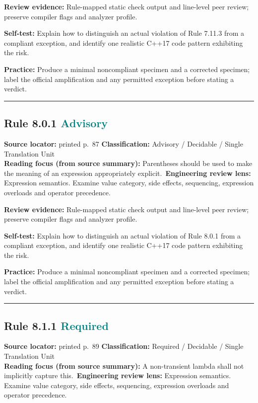 \documentclass[10pt,letterpaper]{article}
\begin{document}
\textbf{Review evidence:} Rule-mapped static check output and line-level peer review; preserve compiler flags and analyzer profile.

\textbf{Self-test:} Explain how to distinguish an actual violation of Rule 7.11.3 from a compliant exception, and identify one realistic C++17 code pattern exhibiting the risk.\par
\textbf{Practice:} Produce a minimal noncompliant specimen and a corrected specimen; label the official amplification and any permitted exception before stating a verdict.
\smallskip\hrule\smallskip
\subsection*{Rule 8.0.1 \enspace \texorpdfstring{\small\textcolor{teal}{Advisory}}{Advisory}}
\noindent\textbf{Source locator:} printed p.~87 \quad\textbf{Classification:} Advisory / Decidable / Single Translation Unit\\
\textbf{Reading focus (from source summary):} Parentheses should be used to make the meaning of an expression appropriately explicit.\
\textbf{Engineering review lens:} Expression semantics. Examine value category, side effects, sequencing, expression overloads and operator precedence.

\textbf{Review evidence:} Rule-mapped static check output and line-level peer review; preserve compiler flags and analyzer profile.

\textbf{Self-test:} Explain how to distinguish an actual violation of Rule 8.0.1 from a compliant exception, and identify one realistic C++17 code pattern exhibiting the risk.\par
\textbf{Practice:} Produce a minimal noncompliant specimen and a corrected specimen; label the official amplification and any permitted exception before stating a verdict.
\smallskip\hrule\smallskip
\subsection*{Rule 8.1.1 \enspace \texorpdfstring{\small\textcolor{teal}{Required}}{Required}}
\noindent\textbf{Source locator:} printed p.~89 \quad\textbf{Classification:} Required / Decidable / Single Translation Unit\\
\textbf{Reading focus (from source summary):} A non-transient lambda shall not implicitly capture this.\
\textbf{Engineering review lens:} Expression semantics. Examine value category, side effects, sequencing, expression overloads and operator precedence.
\end{document}
